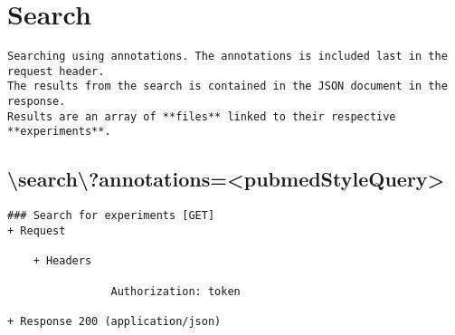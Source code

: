 \section*{Search}
\begin{verbatim}
Searching using annotations. The annotations is included last in the request header. 
The results from the search is contained in the JSON document in the response. 
Results are an array of **files** linked to their respective **experiments**.
\end{verbatim}

\subsection*{\textbackslash search\textbackslash ?annotations=<pubmedStyleQuery>}
\begin{verbatim}
### Search for experiments [GET]
+ Request

    + Headers
    
                Authorization: token
                
+ Response 200 (application/json)


\end{verbatim}
